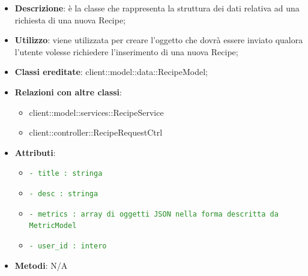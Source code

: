			\begin{itemize}
				\item \textbf{Descrizione}: è la classe che rappresenta la struttura dei dati relativa ad una richiesta di una nuova Recipe;
				\item \textbf{Utilizzo}: viene utilizzata per creare l'oggetto che dovrà essere inviato qualora l'utente volesse richiedere l'inserimento di una nuova Recipe;
				\item \textbf{Classi ereditate}: client::model::data::RecipeModel;
				\item \textbf{Relazioni con altre classi}:
					\begin{itemize}
						\item client::model::services::RecipeService
						\item client::controller::RecipeRequestCtrl
					\end{itemize}
				\item \textbf{Attributi}:
					\begin{itemize}
						\item \textcolor{forestgreen}{\texttt{- title : stringa}}
						\item \textcolor{forestgreen}{\texttt{- desc : stringa}}
						\item \textcolor{forestgreen}{\texttt{- metrics : array di oggetti JSON nella forma descritta da MetricModel}}
						\item \textcolor{forestgreen}{\texttt{- user\_id : intero}}
					\end{itemize}
				\item \textbf{Metodi}: N/A
			\end{itemize}

